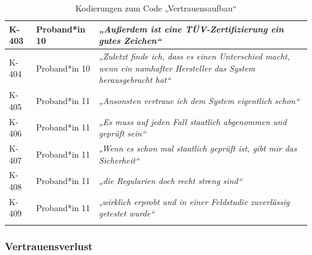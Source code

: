 {\begin{xltabular}{\textwidth}{
    |P{0.10\textwidth}
    |P{0.17\textwidth}
    |Y|
}
\hline
K-403 & Proband*in 10 & \textit{„Außerdem ist eine TÜV-Zertifizierung ein gutes Zeichen“} \\
\hline
K-404 & Proband*in 10 & \textit{„Zuletzt finde ich, dass es einen Unterschied macht, wenn ein namhafter Hersteller das System herausgebracht hat“} \\
\hline
K-405 & Proband*in 11 & \textit{„Ansonsten vertraue ich dem System eigentlich schon“} \\
\hline
K-406 & Proband*in 11 & \textit{„Es muss auf jeden Fall staatlich abgenommen und geprüft sein“} \\
\hline
K-407 & Proband*in 11 & \textit{„Wenn es schon mal staatlich geprüft ist, gibt mir das Sicherheit“} \\
\hline
K-408 & Proband*in 11 & \textit{„die Regularien doch recht streng sind“} \\
\hline
K-409 & Proband*in 11 & \textit{„wirklich erprobt und in einer Feldstudie zuverlässig getestet wurde“} \\
\hline
\caption{Kodierungen zum Code „Vertrauensaufbau“}\label{tab:kodiernachweis-vertrauensaufbau}\\
\end{xltabular}
}

\clearpage
\subsubsection{Vertrauensverlust}

